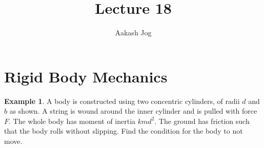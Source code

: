 \documentclass[fleqn, a4paper, 12pt]{article}
\title{Lecture 18}
\author{Aakash Jog}
\date{\formatdate{30}{12}{2014}}
\theoremstyle{definition}
\newtheorem{example}{Example}
\theoremstyle{theorem}
\begin{document}
\maketitle

\tableofcontents

\newpage
\section{Rigid Body Mechanics}

\begin{example}
	A body is constructed using two concentric cylinders, of radii $d$ and $b$ as shown. A string is wound around the inner cylinder and is pulled with force $F$. The whole body has moment of inertia $k m d^2$. The ground has friction such that the body rolls without slipping. Find the condition for the body to not move.\\
\end{example}
\end{document}
